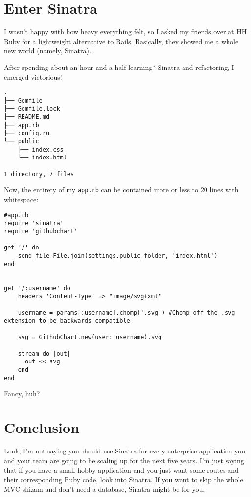 \documentclass[12pt]{article}
\begin{document}
\section{Enter Sinatra}\label{enter-sinatra}

I wasn't happy with how heavy everything felt, so I asked my friends
over at \href{https://www.facebook.com/groups/HHRuby/}{HH Ruby} for a
lightweight alternative to Rails. Basically, they showed me a whole new
world (namely, \href{http://www.sinatrarb.com/}{Sinatra}).


After spending about an hour and a half learning* Sinatra and
refactoring, I emerged victorious!

\begin{verbatim}
.
├── Gemfile
├── Gemfile.lock
├── README.md
├── app.rb
├── config.ru
└── public
    ├── index.css
    └── index.html

1 directory, 7 files
\end{verbatim}

Now, the entirety of my \texttt{app.rb} can be contained more or less to
20 lines with whitespace:

\begin{lstlisting}
#app.rb
require 'sinatra'
require 'githubchart'

get '/' do
    send_file File.join(settings.public_folder, 'index.html')
end


get '/:username' do
    headers 'Content-Type' => "image/svg+xml"

    username = params[:username].chomp('.svg') #Chomp off the .svg extension to be backwards compatible

    svg = GithubChart.new(user: username).svg

    stream do |out|
      out << svg
    end
end
\end{lstlisting}

Fancy, huh?

\section{Conclusion}\label{conclusion}

Look, I'm not saying you should use Sinatra for every enterprise
application you and your team are going to be scaling up for the next
five years. I'm just saying that if you have a small hobby application
and you just want some routes and their corresponding Ruby code, look
into Sinatra. If you want to skip the whole MVC shizam and don't need a
database, Sinatra might be for you.
\end{document}
